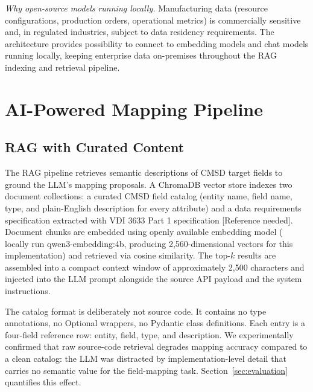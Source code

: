 \documentclass[3p,times,procedia]{elsarticle}
\begin{document}
\textit{Why open-source models running locally.} Manufacturing data (resource configurations, production orders, operational metrics) is commercially sensitive and, in regulated industries, subject to data residency requirements. The architecture provides possibility to connect to embedding models and chat models running locally, keeping enterprise data on-premises throughout the RAG indexing and retrieval pipeline.

\section{AI-Powered Mapping Pipeline}
\label{sec:pipeline}

\subsection{RAG with Curated Content}
\label{sec:pipeline-rag}

The RAG pipeline retrieves semantic descriptions of CMSD target fields to ground the LLM’s mapping proposals. A ChromaDB vector store indexes two document collections: a curated CMSD field catalog (entity name, field name, type, and plain-English description for every attribute) and a data requirements specification extracted with VDI 3633 Part 1 specification [Reference needed]. Document chunks are embedded using openly available embedding model ( locally run qwen3-embedding:4b, producing 2,560-dimensional vectors for this implementation) and retrieved via cosine similarity. The top-$k$ results are assembled into a compact context window of approximately 2,500 characters and injected into the LLM prompt alongside the source API payload and the system instructions.

The catalog format is deliberately not source code. It contains no type annotations, no Optional wrappers, no Pydantic class definitions. Each entry is a four-field reference row: entity, field, type, and description. We experimentally confirmed that raw source-code retrieval degrades mapping accuracy compared to a clean catalog: the LLM was distracted by implementation-level detail that carries no semantic value for the field-mapping task. Section~\ref{sec:evaluation} quantifies this effect.
\end{document}
